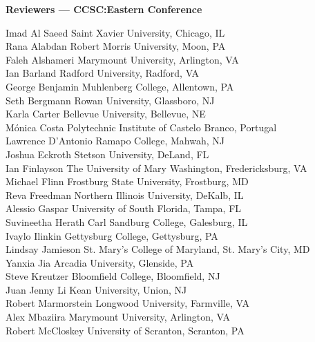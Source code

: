 \documentclass{article}
\begin{document}
\begingroup
  \centering
  \textbf{\large Reviewers --- CCSC:Eastern Conference}\\
\endgroup

\vspace{10pt}

{\parindent0pt
Imad Al Saeed \dotfill Saint Xavier University, Chicago, IL\\
Rana Alabdan \dotfill Robert Morris University, Moon, PA\\
Faleh Alshameri \dotfill Marymount University, Arlington, VA\\
Ian Barland \dotfill Radford University, Radford, VA\\
George Benjamin \dotfill Muhlenberg College, Allentown, PA\\
Seth Bergmann \dotfill Rowan University, Glassboro, NJ\\
Karla Carter \dotfill Bellevue University, Bellevue, NE\\
Mónica Costa \dotfill Polytechnic Institute of Castelo Branco, Portugal\\
Lawrence D'Antonio \dotfill Ramapo College, Mahwah, NJ\\
Joshua Eckroth \dotfill Stetson University, DeLand, FL\\
Ian Finlayson \dotfill The University of Mary Washington, Fredericksburg, VA\\
Michael Flinn \dotfill Frostburg State University, Frostburg, MD\\
Reva Freedman \dotfill Northern Illinois University, DeKalb, IL\\
Alessio Gaspar \dotfill University of South Florida, Tampa, FL\\
Suvineetha Herath \dotfill Carl Sandburg College, Galesburg, IL\\
Ivaylo Ilinkin \dotfill Gettysburg College, Gettysburg, PA\\
Lindsay Jamieson \dotfill St. Mary's College of Maryland, St. Mary's City, MD\\
Yanxia Jia \dotfill Arcadia University, Glenside, PA\\
Steve Kreutzer \dotfill Bloomfield College, Bloomfield, NJ\\
Juan Jenny Li \dotfill Kean University, Union, NJ\\
Robert Marmorstein \dotfill Longwood University, Farmville, VA\\
Alex Mbaziira \dotfill Marymount University, Arlington, VA\\
Robert McCloskey \dotfill University of Scranton, Scranton, PA\\
}
\end{document}
